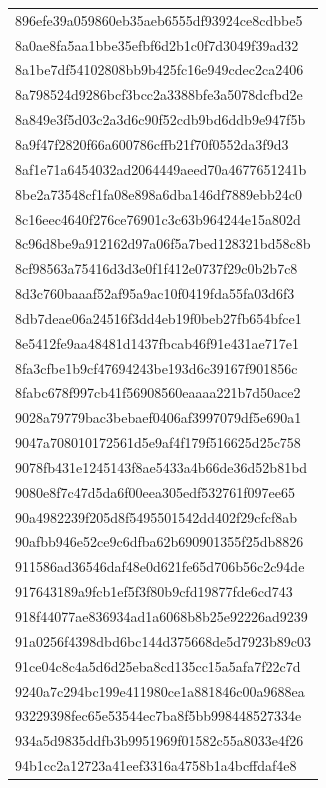 \begin{tabular}{l}
896efe39a059860eb35aeb6555df93924ce8cdbbe5 \\
8a0ae8fa5aa1bbe35efbf6d2b1c0f7d3049f39ad32 \\
8a1be7df54102808bb9b425fc16e949cdec2ca2406 \\
8a798524d9286bcf3bcc2a3388bfe3a5078dcfbd2e \\
8a849e3f5d03c2a3d6c90f52cdb9bd6ddb9e947f5b \\
8a9f47f2820f66a600786cffb21f70f0552da3f9d3 \\
8af1e71a6454032ad2064449aeed70a4677651241b \\
8be2a73548cf1fa08e898a6dba146df7889ebb24c0 \\
8c16eec4640f276ce76901c3c63b964244e15a802d \\
8c96d8be9a912162d97a06f5a7bed128321bd58c8b \\
8cf98563a75416d3d3e0f1f412e0737f29c0b2b7c8 \\
8d3c760baaaf52af95a9ac10f0419fda55fa03d6f3 \\
8db7deae06a24516f3dd4eb19f0beb27fb654bfce1 \\
8e5412fe9aa48481d1437fbcab46f91e431ae717e1 \\
8fa3cfbe1b9cf47694243be193d6c39167f901856c \\
8fabc678f997cb41f56908560eaaaa221b7d50ace2 \\
9028a79779bac3bebaef0406af3997079df5e690a1 \\
9047a708010172561d5e9af4f179f516625d25c758 \\
9078fb431e1245143f8ae5433a4b66de36d52b81bd \\
9080e8f7c47d5da6f00eea305edf532761f097ee65 \\
90a4982239f205d8f5495501542dd402f29cfcf8ab \\
90afbb946e52ce9c6dfba62b690901355f25db8826 \\
911586ad36546daf48e0d621fe65d706b56c2c94de \\
917643189a9fcb1ef5f3f80b9cfd19877fde6cd743 \\
918f44077ae836934ad1a6068b8b25e92226ad9239 \\
91a0256f4398dbd6bc144d375668de5d7923b89c03 \\
91ce04c8c4a5d6d25eba8cd135cc15a5afa7f22c7d \\
9240a7c294bc199e411980ce1a881846c00a9688ea \\
93229398fec65e53544ec7ba8f5bb998448527334e \\
934a5d9835ddfb3b9951969f01582c55a8033e4f26 \\
94b1cc2a12723a41eef3316a4758b1a4bcffdaf4e8 \\

\end{tabular}
